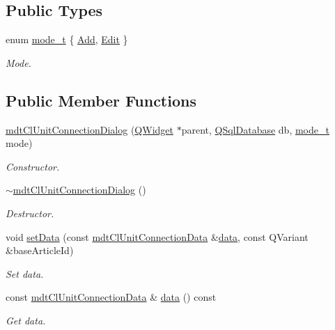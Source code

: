 \subsection*{Public Types}
\begin{DoxyCompactItemize}
\item 
enum \hyperlink{classmdt_cl_unit_connection_dialog_a754889f1591eddb79b69de4c51532f43}{mode\-\_\-t} \{ \hyperlink{classmdt_cl_unit_connection_dialog_a754889f1591eddb79b69de4c51532f43a65365660e45940b053efbf543aa2c10c}{Add}, 
\hyperlink{classmdt_cl_unit_connection_dialog_a754889f1591eddb79b69de4c51532f43a855eaf8093ea6043e46688cc5115643f}{Edit}
 \}
\begin{DoxyCompactList}\small\item\em Mode. \end{DoxyCompactList}\end{DoxyCompactItemize}
\subsection*{Public Member Functions}
\begin{DoxyCompactItemize}
\item 
\hyperlink{classmdt_cl_unit_connection_dialog_adf4b609e4ba336afd698f5d40744756c}{mdt\-Cl\-Unit\-Connection\-Dialog} (\hyperlink{class_q_widget}{Q\-Widget} $\ast$parent, \hyperlink{class_q_sql_database}{Q\-Sql\-Database} db, \hyperlink{classmdt_cl_unit_connection_dialog_a754889f1591eddb79b69de4c51532f43}{mode\-\_\-t} mode)
\begin{DoxyCompactList}\small\item\em Constructor. \end{DoxyCompactList}\item 
\hyperlink{classmdt_cl_unit_connection_dialog_a13e97c80ada11457bbf7b1c4173a09b1}{$\sim$mdt\-Cl\-Unit\-Connection\-Dialog} ()
\begin{DoxyCompactList}\small\item\em Destructor. \end{DoxyCompactList}\item 
void \hyperlink{classmdt_cl_unit_connection_dialog_a1692e64b3b636cd1e10df1da0ae7fdf5}{set\-Data} (const \hyperlink{classmdt_cl_unit_connection_data}{mdt\-Cl\-Unit\-Connection\-Data} \&\hyperlink{classmdt_cl_unit_connection_dialog_a32ab19b0b29e1d7b188518d26d6dd72e}{data}, const Q\-Variant \&base\-Article\-Id)
\begin{DoxyCompactList}\small\item\em Set data. \end{DoxyCompactList}\item 
const \hyperlink{classmdt_cl_unit_connection_data}{mdt\-Cl\-Unit\-Connection\-Data} \& \hyperlink{classmdt_cl_unit_connection_dialog_a32ab19b0b29e1d7b188518d26d6dd72e}{data} () const 
\begin{DoxyCompactList}\small\item\em Get data. \end{DoxyCompactList}\end{DoxyCompactItemize}


